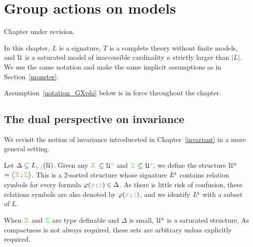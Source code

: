 \chapter{Group actions on models}
\label{actions}

\def\medrel#1{\parbox[t]{5ex}{$\displaystyle\hfil #1$}}
\def\ceq#1#2#3{\parbox[t]{17ex}{$\displaystyle #1$}\medrel{#2}{$\displaystyle #3$}}

\noindent\llap{\textcolor{red}{\Large\warning}\kern1.5ex}\ignorespaces
Chapter under revision.

In this chapter, $L$ is a signature, $T$ is a complete theory without finite models, and $\EuScript U$ is a saturated model of inaccessible cardinality $\kappa$ strictly larger than $|L|$.
We use the same notation and make the same implicit assumptions as in Section~\ref{monster}.

Assumption~\ref{notation_GXphi} below is in force throughout the chapter.

\section{The dual perspective on invariance}\label{dual_perspective}

We revisit the notion of invariance introduceted in Chapter~\ref{invariant} in a more general setting.

\begin{assumption}\label{notation_GXphi}
Let $\Delta\subseteq L_{{\color{brown} x}\,{\color{green} z}}(\EuScript U)$.
Given any \emph{${\color{brown}\EuScript X}$\/} $\subseteq\EuScript U^{\color{brown} x}$ and \emph{${\color{green}\EuScript Z}$\/} $\subseteq\EuScript U^{\color{green} z}$, we define the structure \emph{$\EuScript U\kern-.2ex^{\scriptscriptstyle\Delta}$\/} $=\big\langle{\color{brown}\EuScript X}\,;{\color{green}\EuScript Z}\big\rangle$.
This is a 2-sorted structure whose signature  \emph{$L\kern-.5ex^{\scriptscriptstyle\Delta}$\/} contains relation symbols for every formula $\varphi({\color{brown} x}\,;{\color{green} z})\in\Delta$.
As there is little risk of confusion, these relations symbols are also denoted by $\varphi({\color{brown} x}\,;{\color{green} z})$, and we identify $L\kern-.5ex^{\scriptscriptstyle\Delta}$ with a subset of $L$. 
\end{assumption}

When ${\color{brown}\EuScript X}$ and ${\color{green}\EuScript Z}$ are type definable and $\Delta$ is small, $\EuScript U\kern-.2ex^{\scriptscriptstyle\Delta}$ is a saturated structure.
As compactness is not always required, these sets are arbitrary unless explicitly required.

